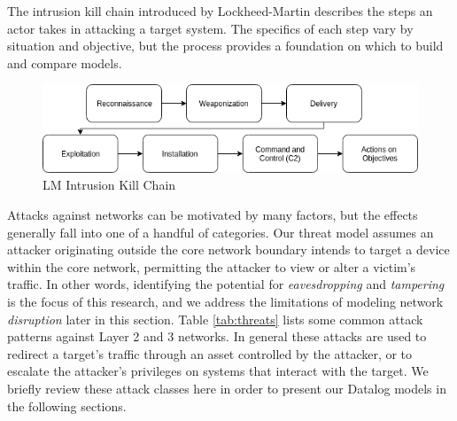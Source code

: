 
The intrusion kill chain introduced by Lockheed-Martin\cite{Hutchins_Cloppert_Amin} describes the steps an actor takes in attacking a target system. The specifics of each step vary by situation and objective, but the process provides a foundation on which to build and compare models.


\begin{figure}[ht]
\centering
\includegraphics[width=.8\linewidth]{resource/img/ch_background/intrusion_kill_chain.png}
\caption{LM Intrusion Kill Chain\cite{Hutchins_Cloppert_Amin}}
\label{fig:background:kill_chain}
\end{figure} 

Attacks against networks can be motivated by many factors, but the effects generally fall into one of a handful of categories\cite{Chakrabarti_Govindarasu_2002}. Our threat model assumes an attacker originating outside the core network boundary intends to target a device within the core network, permitting the attacker to view or alter a victim's traffic. In other words, identifying the potential for \textit{eavesdropping} and \textit{tampering} is the focus of this research, and we address the limitations of modeling network \textit{disruption} later in this section. Table \ref{tab:threats} lists some common attack patterns against Layer 2 and 3 networks. In general these attacks are used to redirect a target's traffic through an asset controlled by the attacker, or to escalate the attacker's privileges on systems that interact with the target. We briefly review these attack classes here in order to present our Datalog models in the following sections.



\begin{table}[ht]
\centering
\captionsetup{justification=centering}
\caption{Potential Threats}
\label{tab:threats}
\end{table}

